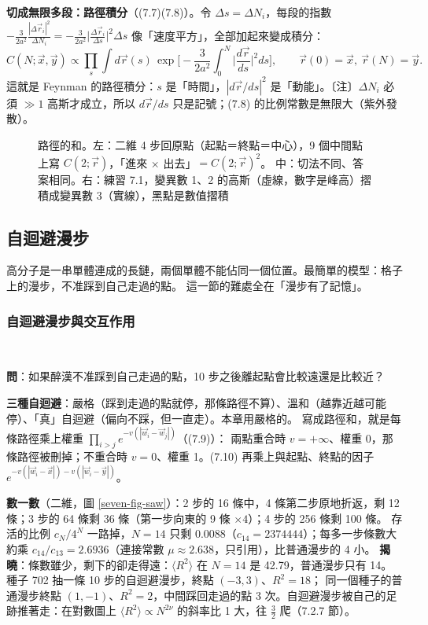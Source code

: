 \textbf{切成無限多段：路徑積分}（(7.7)(7.8)）。令 $\Delta s=\Delta N_i$，每段的指數 $-\frac{3}{2a^2}\frac{|\Delta\vec r_i|^2}{\Delta N_i}=-\frac{3}{2a^2}\big|\frac{\Delta\vec r_i}{\Delta s}\big|^2\Delta s$
像「速度平方」，全部加起來變成積分：
\[C(N;\vec x,\vec y)\propto\prod_s\int d\vec r(s)\,\exp\Big[-\frac{3}{2a^2}\int_0^N\Big|\frac{d\vec r}{ds}\Big|^2ds\Big],\qquad\vec r(0)=\vec x,\ \vec r(N)=\vec y.\tag{7.8}\]
這就是 Feynman 的路徑積分：$s$ 是「時間」，$|d\vec r/ds|^2$ 是「動能」。〔注〕$\Delta N_i$ 必須 $\gg1$ 高斯才成立，所以 $d\vec r/ds$ 只是記號；(7.8) 的比例常數是無限大（紫外發散）。

\begin{figure}[htbp]
\centering
\SevenFigGrid\hfill{\footnotesize\setlength{\tabcolsep}{4pt}\SevenTabSplit}\hfill\SevenFigGauss
\caption{路徑的和。左：二維 4 步回原點（起點＝終點＝中心），9 個中間點上寫 $C(2;\vec r)$，「進來 × 出去」$=C(2;\vec r)^2$。
中：切法不同、答案相同。右：練習 7.1，變異數 1、2 的高斯（虛線，數字是峰高）摺積成變異數 3（實線），黑點是數值摺積}\label{seven-fig-split}
\end{figure}

\subsection{自迴避漫步}
\leavevmode{}\quad 高分子是一串單體連成的長鏈，兩個單體不能佔同一個位置。最簡單的模型：格子上的漫步，不准踩到自己走過的點。
這一節的難處全在「漫步有了記憶」。

\subsubsection{自迴避漫步與交互作用}
\leavevmode{}\ \par\nopagebreak

\textbf{問}：如果醉漢不准踩到自己走過的點，10 步之後離起點會比較遠還是比較近？

\textbf{三種自迴避}：嚴格（踩到走過的點就停，那條路徑不算）、溫和（越靠近越可能停）、「真」自迴避（偏向不踩，但一直走）。本章用嚴格的。
寫成路徑和，就是每條路徑乘上權重 $\prod_{i>j}e^{-v(|\vec w_i-\vec w_j|)}$（(7.9)）：
兩點重合時 $v=+\infty$、權重 0，那條路徑被刪掉；不重合時 $v=0$、權重 1。(7.10) 再乘上與起點、終點的因子 $e^{-v(|\vec w_i-\vec x|)-v(|\vec w_i-\vec y|)}$。

\textbf{數一數}（二維，圖 \ref{seven-fig-saw}）：2 步的 16 條中，4 條第二步原地折返，剩 12 條；3 步的 64 條剩 36 條（第一步向東的 9 條 $\times4$）；4 步的 256 條剩 100 條。
存活的比例 $c_N/4^N$ 一路掉，$N=14$ 只剩 0.0088（$c_{14}=2374444$）；每多一步條數大約乘 $c_{14}/c_{13}=2.6936$（連接常數 $\mu\approx2.638$，只引用），比普通漫步的 4 小。
\textbf{揭曉}：條數雖少，剩下的卻走得遠：$\langle R^2\rangle$ 在 $N=14$ 是 42.79，普通漫步只有 14。種子 702 抽一條 10 步的自迴避漫步，終點 $(-3,3)$、$R^2=18$；
同一個種子的普通漫步終點 $(1,-1)$、$R^2=2$，中間踩回走過的點 3 次。自迴避漫步被自己的足跡推著走：在對數圖上 $\langle R^2\rangle\propto N^{2\nu}$ 的斜率比 1 大，往 $\frac32$ 爬（7.2.7 節）。

